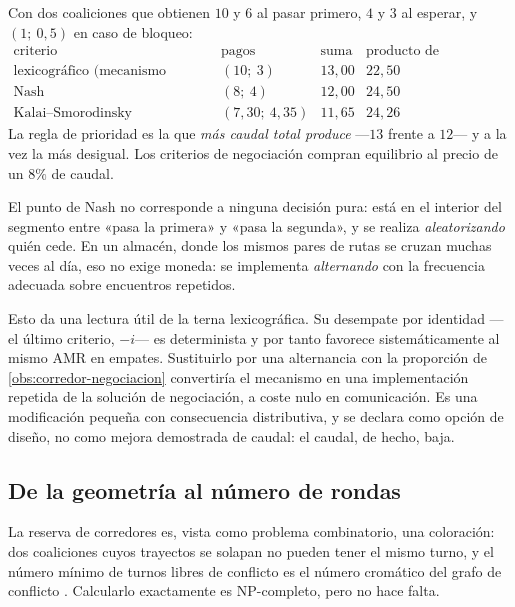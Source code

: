 \begin{observacion}
\label{obs:corredor-negociacion}
Con dos coaliciones que obtienen $10$ y $6$ al pasar primero, $4$ y $3$ al
esperar, y $(1;\ 0{,}5)$ en caso de bloqueo:
\[
  \begin{array}{lccc}
    \text{criterio} & \text{pagos} & \text{suma} & \text{producto de excedentes}\\\hline
    \text{lexicográfico (mecanismo actual)} & (10;\ 3) & 13{,}00 & 22{,}50\\
    \text{Nash} & (8;\ 4) & 12{,}00 & 24{,}50\\
    \text{Kalai--Smorodinsky} & (7{,}30;\ 4{,}35) & 11{,}65 & 24{,}26
  \end{array}
\]
La regla de prioridad es la que \emph{más caudal total produce} —$13$ frente a
$12$— y a la vez la más desigual. Los criterios de negociación compran equilibrio
al precio de un $8\%$ de caudal.
\end{observacion}

\begin{observacion}
\label{obs:alternancia}
El punto de Nash no corresponde a ninguna decisión pura: está en el interior del
segmento entre «pasa la primera» y «pasa la segunda», y se realiza
\emph{aleatorizando} quién cede. En un almacén, donde los mismos pares de rutas
se cruzan muchas veces al día, eso no exige moneda: se implementa
\emph{alternando} con la frecuencia adecuada sobre encuentros repetidos.

Esto da una lectura útil de la terna lexicográfica. Su desempate por
identidad —el último criterio, $-i$— es determinista y por tanto favorece
sistemáticamente al mismo AMR en empates. Sustituirlo por una alternancia con la
proporción de \cref{obs:corredor-negociacion} convertiría el mecanismo en una
implementación repetida de la solución de negociación, a coste nulo en
comunicación. Es una modificación pequeña con consecuencia distributiva, y se
declara como opción de diseño, no como mejora demostrada de caudal: el caudal,
de hecho, baja.
\end{observacion}

\subsection{De la geometría al número de rondas}

La reserva de corredores es, vista como problema combinatorio, una coloración: dos
coaliciones cuyos trayectos se solapan no pueden tener el mismo turno, y el número
mínimo de turnos libres de conflicto es el número cromático del grafo de conflicto
\cite{yadav2023advanced}. Calcularlo exactamente es NP-completo, pero no hace
falta.

